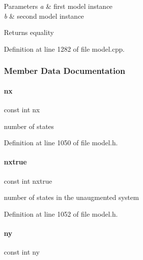 \begin{DoxyParams}{Parameters}
{\em a} & first model instance \\
\hline
{\em b} & second model instance \\
\hline
\end{DoxyParams}
\begin{DoxyReturn}{Returns}
equality 
\end{DoxyReturn}


Definition at line 1282 of file model.\+cpp.



\subsubsection{Member Data Documentation}
\mbox{\label{classamici_1_1_model_a4f88110916f09b2adef33396203ff015}} 
\paragraph{\texorpdfstring{nx}{nx}}
{\footnotesize\ttfamily const int nx}

number of states 

Definition at line 1050 of file model.\+h.

\mbox{\label{classamici_1_1_model_acf5766cc8560edbdcec5b8ef79459239}} 
\paragraph{\texorpdfstring{nxtrue}{nxtrue}}
{\footnotesize\ttfamily const int nxtrue}

number of states in the unaugmented system 

Definition at line 1052 of file model.\+h.

\mbox{\label{classamici_1_1_model_a811734e12750524808dba01c57e92c66}} 
\paragraph{\texorpdfstring{ny}{ny}}
{\footnotesize\ttfamily const int ny}

